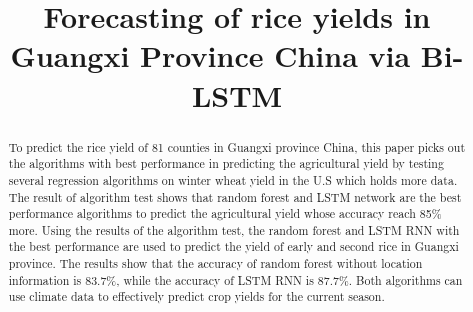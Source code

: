 \documentclass[conference]{IEEEtran}
\begin{document}
\title{Forecasting of rice yields in Guangxi Province China via Bi-LSTM}

\author{
\and
{}
\and
{}
\and
{}
\and
{}
\and
{}
}

\maketitle

\begin{abstract}
To predict the rice yield of 81 counties in Guangxi province China, this paper picks out the algorithms with best performance in predicting the agricultural yield by testing several regression algorithms on winter wheat yield in the U.S which holds more data. The result of algorithm test shows that random forest and LSTM network are the best performance algorithms to predict the agricultural yield whose accuracy reach 85\% more. Using the results of the algorithm test, the random forest and LSTM RNN with the best performance are used to predict the yield of early and second rice in Guangxi province. The results show that the accuracy of random forest without location information is 83.7\%, while the accuracy of LSTM RNN is 87.7\%. Both algorithms can use climate data to effectively predict crop yields for the current season.
\end{abstract}
\end{document}
